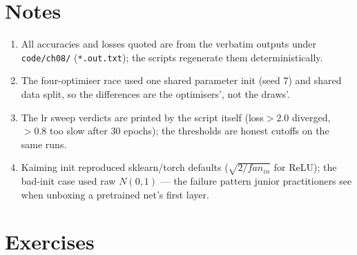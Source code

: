 \section*{Notes}
\begin{enumerate}
\item[\textbf{1.}] All accuracies and losses quoted are from the
verbatim outputs under \texttt{code/ch08/} (\texttt{*.out.txt}); the
scripts regenerate them deterministically.
\item[\textbf{2.}] The four-optimiser race used one shared parameter
init (seed 7) and shared data split, so the differences are the
optimisers', not the draws'.
\item[\textbf{3.}] The lr sweep verdicts are printed by the script
itself (loss$>2.0$ diverged, $>0.8$ too slow after 30 epochs); the
thresholds are honest cutoffs on the same runs.
\item[\textbf{4.}] Kaiming init reproduced sklearn/torch defaults
($\sqrt{2/fan_{in}}$ for ReLU); the bad-init case used raw
$N(0,1)$ --- the failure pattern junior practitioners see when
unboxing a pretrained net's first layer.
\end{enumerate}

\section{Exercises}
\label{sec:trainexercises}

